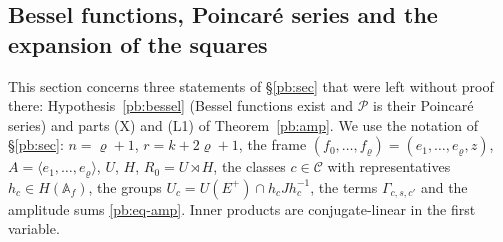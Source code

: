 \documentclass[10pt]{amsart}
\theoremstyle{definition}
\theoremstyle{remark}
\providecommand{\auAz}{\mathcal A_0}
\providecommand{\auDX}{D_X}
\providecommand{\auF}{\mathbb F}
\providecommand{\auG}{\overline G}
\providecommand{\auGL}{\mathrm{GL}}
\providecommand{\auP}{\mathcal P}
\providecommand{\auPl}{\Phi}
\providecommand{\auS}{\mathcal S}
\providecommand{\auU}{\mathrm U}
\providecommand{\aubar}[1]{\overline{#1}}
\providecommand{\pbDid}{\mathcal D_{\mathrm{id}}}
\providecommand{\pbDmain}{\mathcal D_{\mathrm{main}}}
\providecommand{\pbR}{\overline R_0}
\providecommand{\pbrpsi}{r_\psi}
\begin{document}
\providecommand{\auO}{\mathcal O}
\providecommand{\auPl}{\Phi}
\providecommand{\auPa}{\Phi_a}
\providecommand{\auS}{\mathcal S}
\providecommand{\auAz}{\mathcal A_0}
\providecommand{\auG}{\overline G}
\providecommand{\auP}{\mathcal P}
\providecommand{\auDX}{D_X}
\providecommand{\auNm}{\operatorname{Nm}}
\providecommand{\auU}{\mathrm U}
\providecommand{\auGL}{\mathrm{GL}}
\providecommand{\auA}{\mathbb A}
\providecommand{\auF}{\mathbb F}
\providecommand{\aurd}{\mathrm{rd}_E}
\providecommand{\aubar}[1]{\overline{#1}}
\providecommand{\auf}[1]{\texttt{#1}}
\providecommand{\panot}[1]{\par\smallskip{\raggedright\noindent\textbf{[Not proved here:} #1\textbf{]}\par}\smallskip}
\providecommand{\pbR}{\overline R_0}
\providecommand{\pbUb}{\overline U}
\providecommand{\pbHb}{\overline H}
\providecommand{\pbvol}{\operatorname{vol}}
\providecommand{\pbDid}{\mathcal D_{\mathrm{id}}}
\providecommand{\pbDmain}{\mathcal D_{\mathrm{main}}}
\providecommand{\pbdeg}{\operatorname{deg}}
\providecommand{\pbrpsi}{r_\psi}
\providecommand{\pbW}{\mathbb W}
\providecommand{\pbg}{\mathsf g}
\providecommand{\pbLM}{\mathrm{LM}}
\providecommand{\pbone}{\mathbf 1}
\providecommand{\pbHS}[1]{\|#1\|}
\providecommand{\pbip}[2]{\langle#1,#2\rangle}
\providecommand{\pbel}{\ell}
\providecommand{\pbels}{\tilde\ell}
\providecommand{\pbeL}{\mathsf L}
\providecommand{\pbeq}{\mathsf q}
\providecommand{\pbeB}{\mathsf B}
\providecommand{\pbeN}{\mathcal N}
\providecommand{\pbet}{\beta_*}
\providecommand{\pbenp}{\mathsf n_{\mathrm p}}
\providecommand{\pbesz}{\operatorname{size}}
\providecommand{\pbeGs}{\Gamma^*}
\providecommand{\pbeAp}{A^{+}}
\providecommand{\pbeCL}{\mathrm{CL}}

\subsection{Bessel functions, Poincar\'e series and the expansion of the squares}\label{pbe:sec}

This section concerns three statements of \S\ref{pb:sec} that were left without proof there:
Hypothesis~\ref{pb:bessel} (Bessel functions exist and $\auP$ is their Poincar\'e series) and parts
\textup{(X)} and \textup{(L1)} of Theorem~\ref{pb:amp}. We use the notation of \S\ref{pb:sec}:
$n=\varrho+1$, $r=k+2\varrho+1$, the frame $(f_0,\dots,f_\varrho)=(e_1,\dots,e_\varrho,z)$,
$A=\langle e_1,\dots,e_\varrho\rangle$, $U$, $H$, $R_0=U\rtimes H$, the classes $c\in\mathcal C$ with
representatives $h_c\in H(\auA_f)$, the groups $U_c=U(E^+)\cap h_cJh_c^{-1}$, the terms
$\Gamma_{c,s,c'}$ and the amplitude sums \eqref{pb:eq-amp}. Inner products are conjugate-linear in the
first variable.
\end{document}
